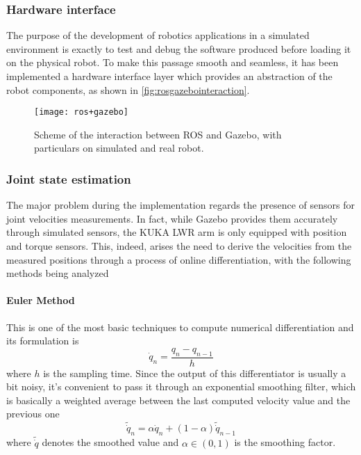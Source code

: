 \subsubsection{Hardware interface}
The purpose of the development of robotics applications in a simulated environment is exactly to test and debug the software produced before loading it on the physical robot. To make this passage smooth and seamless, it has been implemented a hardware interface layer which provides an abstraction of the robot components, as shown in \autoref{fig:rosgazebointeraction}.
\begin{figure}[H]
\centerline{\texttt{[image: ros+gazebo]}}
\caption[Scheme of the interaction between ROS and Gazebo.]{Scheme of the interaction between ROS and Gazebo, with particulars on simulated and real robot.}
\label{fig:rosgazebointeraction}
\end{figure}

\subsubsection{Joint state estimation}

The major problem during the implementation regards the presence of sensors for joint velocities measurements. In fact, while Gazebo provides them accurately through simulated sensors, the KUKA LWR arm is only equipped with position and torque sensors. This, indeed, arises the need to derive the velocities from the measured positions through a process of online differentiation, with the following methods being analyzed

\paragraph{Euler Method}
This is one of the most basic techniques to compute numerical differentiation and its formulation is
\begin{equation}
\dot{q}_n = \frac{q_n - q_{n-1}}{h}
\end{equation}
where $h$ is the sampling time. Since the output of this differentiator is usually a bit noisy, it's convenient to pass it through an exponential smoothing filter, which is basically a weighted average between the last computed velocity value and the previous one
\begin{equation}
\tilde{\dot{q}}_n = \alpha\dot{q}_n + (1-\alpha)\tilde{\dot{q}}_{n-1} 
\end{equation}
where $\tilde{\dot{q}}$ denotes the smoothed value and $\alpha\in(0,1)$ is the smoothing factor.

